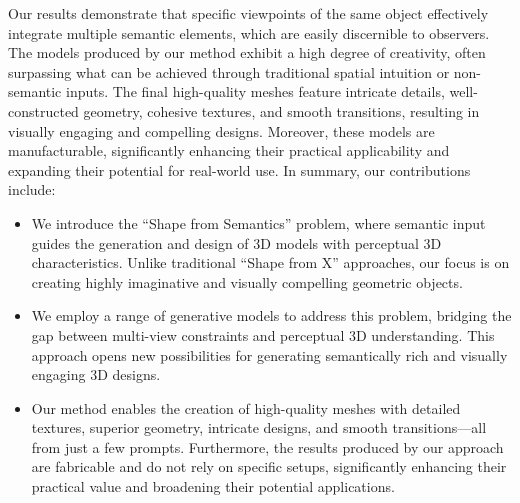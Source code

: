 Our results demonstrate that specific viewpoints of the same object effectively integrate multiple semantic elements, which are easily discernible to observers. The models produced by our method exhibit a high degree of creativity, often surpassing what can be achieved through traditional spatial intuition or non-semantic inputs. The final high-quality meshes feature intricate details, well-constructed geometry, cohesive textures, and smooth transitions, resulting in visually engaging and compelling designs. Moreover, these models are manufacturable, significantly enhancing their practical applicability and expanding their potential for real-world use.
In summary, our contributions include:
\begin{itemize}[leftmargin=*]
    \item We introduce the ``Shape from Semantics'' problem, where semantic input guides the generation and design of 3D models with perceptual 3D characteristics. Unlike traditional ``Shape from X'' approaches, our focus is on creating highly imaginative and visually compelling geometric objects.
    \item We employ a range of generative models to address this problem, bridging the gap between multi-view constraints and perceptual 3D understanding. This approach opens new possibilities for generating semantically rich and visually engaging 3D designs.
    \item Our method enables the creation of high-quality meshes with detailed textures, superior geometry, intricate designs, and smooth transitions—all from just a few prompts. Furthermore, the results produced by our approach are fabricable and do not rely on specific setups, significantly enhancing their practical value and broadening their potential applications.
\end{itemize}